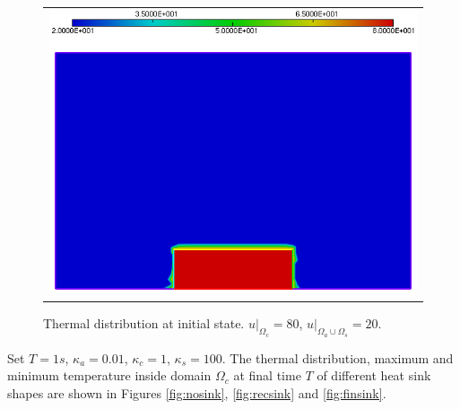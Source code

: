 \begin{figure}[h!]
	\centering
	\begin{tabular}{c}
		\includegraphics[width=.8\linewidth]{figures/begin}
	\end{tabular}
	\caption{Thermal distribution at initial state. $u|_{\Omega_{c}} = 80$, $u|_{\Omega_{a}\cup\Omega_{s}}=20$.}
	\label{fig:ini}
\end{figure}
\quad Set $T=1s$, $\kappa_a=0.01$, $\kappa_c=1$, $\kappa_s=100$. The thermal distribution, maximum and minimum temperature inside domain $\Omega_{c}$  at final time $T$ of different heat sink shapes are shown in Figures \ref{fig:nosink}, \ref{fig:recsink} and \ref{fig:finsink}.\\
